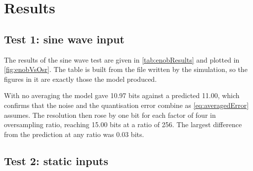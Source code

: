
\section{Results}
\label{sec:results}

\subsection{Test 1: sine wave input}

The results of the sine wave test are given in \cref{tab:enobResults} and
plotted in \cref{fig:enobVsOsr}. The table is built from the file written by
the simulation, so the figures in it are exactly those the model produced.

\begin{table}[htbp]
\centering
{}
\caption{Effective resolution for a sine wave input with \qty{0.5}{LSB} rms of
noise, compared with the prediction of \cref{eq:enobTheory}.}
\label{tab:enobResults}
\end{table}

With no averaging the model gave 10.97 bits against a predicted 11.00, which
confirms that the noise and the quantisation error combine as
\cref{eq:averagedError} assumes. The resolution then rose by one bit for each
factor of four in oversampling ratio, reaching 15.00 bits at a ratio of 256.
The largest difference from the prediction at any ratio was 0.03 bits.



\subsection{Test 2: static inputs}

